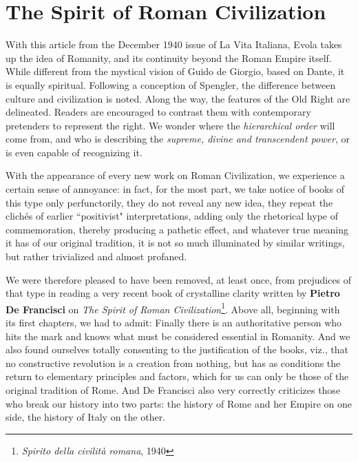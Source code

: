 \section{The Spirit of Roman Civilization}

\begin{quotex}
With this article from the December 1940 issue of La Vita Italiana, Evola takes up the idea of Romanity, and its continuity beyond the Roman Empire itself. While different from the mystical vision of Guido de Giorgio, based on Dante, it is equally spiritual. Following a conception of Spengler, the difference between culture and civilization is noted. Along the way, the features of the Old Right are delineated. Readers are encouraged to contrast them with contemporary pretenders to represent the right. We wonder where the \emph{hierarchical order} will come from, and who is describing the \emph{supreme, divine and transcendent power}, or is even capable of recognizing it. 

\end{quotex}
With the appearance of every new work on Roman Civilization, we experience a certain sense of annoyance: in fact, for the most part, we take notice of books of this type only perfunctorily, they do not reveal any new idea, they repeat the clichés of earlier ``positivist" interpretations, adding only the rhetorical hype of commemoration, thereby producing a pathetic effect, and whatever true meaning it has of our original tradition, it is not so much illuminated by similar writings, but rather trivialized and almost profaned.

We were therefore pleased to have been removed, at least once, from prejudices of that type in reading a very recent book of crystalline clarity written by \textbf{Pietro De Francisci} on \emph{The Spirit of Roman Civilization}\footnote{\emph{Spirito della civilità romana}, 1940}. Above all, beginning with its first chapters, we had to admit: Finally there is an authoritative person who hits the mark and knows what must be considered essential in Romanity. And we also found ourselves totally consenting to the justification of the books, viz., that no constructive revolution is a creation from nothing, but has as conditions the return to elementary principles and factors, which for us can only be those of the original tradition of Rome. And De Francisci also very correctly criticizes those who break our history into two parts: the history of Rome and her Empire on one side, the history of Italy on the other.

